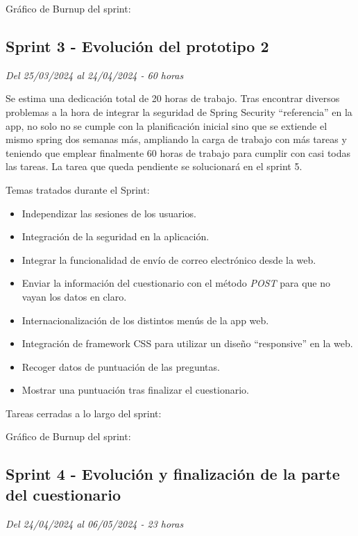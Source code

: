 Gráfico de Burnup del sprint:

\clearpage
\subsection{Sprint 3 - Evolución del prototipo 2}
\textit{Del 25/03/2024 al 24/04/2024 - 60 horas}

Se estima una dedicación total de 20 horas de trabajo.
Tras encontrar diversos problemas a la hora de integrar la seguridad de Spring Security ``referencia'' en la app, no solo no se cumple con la planificación inicial sino que se extiende el mismo spring dos semanas más, ampliando la carga de trabajo con más tareas y teniendo que emplear finalmente 60 horas de trabajo para cumplir con casi todas las tareas.
La tarea que queda pendiente se solucionará en el sprint 5.

Temas tratados durante el Sprint:
\begin{itemize}
	\item
	Independizar las sesiones de los usuarios.
	\item
	Integración de la seguridad en la aplicación.
	\item
	Integrar la funcionalidad de envío de correo electrónico desde la web.
	\item
	Enviar la información del cuestionario con el método \textit{POST} para que no vayan los datos en claro.
	\item
	Internacionalización de los distintos menús de la app web.
	\item
	Integración de framework CSS para utilizar un diseño ``responsive'' en la web.
	\item
	Recoger datos de puntuación de las preguntas.
	\item
	Mostrar una puntuación tras finalizar el cuestionario.
\end{itemize}
\clearpage
Tareas cerradas a lo largo del sprint:

Gráfico de Burnup del sprint:

\clearpage
\subsection{Sprint 4 - Evolución y finalización de la parte del cuestionario}
\textit{Del 24/04/2024 al 06/05/2024 - 23 horas}

